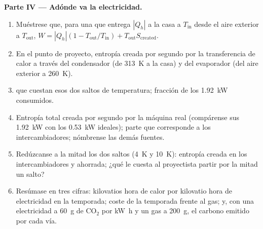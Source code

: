 \begin{problem}
\medskip
\noindent\textbf{Parte IV --- Adónde va la electricidad.}
\begin{enumerate}[resume]
  \item Muéstrese que, para una  que entrega $|Q_h|$ a la
        casa a $T_{\mathrm{in}}$ desde el aire exterior a $T_{\mathrm{out}}$,
        $W = |Q_h|(1 - T_{\mathrm{out}}/T_{\mathrm{in}}) + T_{\mathrm{out}}S_{\mathrm{created}}$.
  \item En el punto de proyecto, entropía creada por segundo por la
        transferencia de calor a través del condensador (de \qty{313}{K} a
        la casa) y del evaporador (del aire exterior a \qty{260}{K}).
  \item {} que cuestan esos dos saltos de temperatura;
        fracción de los \qty{1.92}{kW} consumidos.
  \item Entropía total creada por segundo por la máquina real (compárense
        sus \qty{1.92}{kW} con los \qty{0.53}{kW} ideales); parte que
        corresponde a los intercambiadores; nómbrense las demás fuentes.
  \item Redúzcanse a la mitad los dos saltos (\qty{4}{K} y \qty{10}{K}):
        entropía creada en los intercambiadores y 
        ahorrada; ¿qué le cuesta al proyectista partir por la mitad un
        salto?
  \item Resúmase en tres cifras: kilovatios hora de calor por kilovatio
        hora de electricidad en la temporada; coste de la temporada frente
        al gas; y, con una electricidad a \qty{60}{g} de CO$_2$ por
        \unit{kW h} y un gas a \qty{200}{g}, el carbono emitido por cada vía.
\end{enumerate}
\end{problem}
